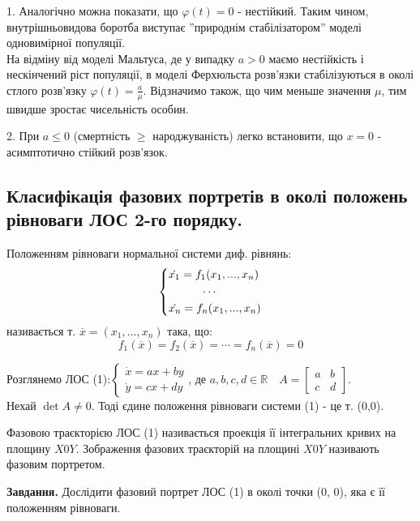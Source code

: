 \begin{remark}
    1. Аналогічно можна показати, що $\varphi (t) = 0$ - нестійкий. Таким чином, внутрішньовидова боротба виступає ''природнім стабілізатором'' моделі одновимірної популяції. \\
    На відміну від моделі Мальтуса, де у випадку $ a > 0$ маємо нестійкість і нескінчений ріст популяції, в моделі Ферхюльста розв'язки стабілізуються в околі стлого розв'язку $\varphi(t) = \frac{a}{\mu}.$ Відзначимо також, що чим меньше значення $\mu$, тим швидше зростає чисельність особин.
\end{remark}

\begin{remark}
    2. При $ a\leq 0$ (смертність $\geq$  народжуваність) легко встановити, що $ x=0 $ - асимптотично стійкий розв'язок.
\end{remark}

\subsection{Класифікація фазових портретів в околі положень рівноваги ЛОС 2-го порядку.}

\begin{defo}
    Положенням рівноваги нормальної системи диф. рівнянь:
    $$
    \begin{dcases}
        \dot{x_1} = f_1(x_1, ..., x_n)\\
        \qquad \quad \cdots\\
        \dot{x_n} = f_n(x_1, ..., x_n)
    \end{dcases}
    $$
    називається т. $\overline{x} = (x_1, ... , x_n)$ така, що:
    $$
    f_1 (\overline{x}) = f_2(\overline{x}) = \cdots = f_n(\overline{x}) =0
    $$
\end{defo}
Розглянемо ЛОС (1):$ \begin{cases}
    \dot{x} = ax + by\\
    \dot{y} = cx + dy
\end{cases}$, де $a,b,c,d \in \mathbb{R} \quad A = \begin{bmatrix}
 a & b\\
 c & d
\end{bmatrix}$.\\
Нехай $\det A \neq 0$. Тоді єдине положення рівноваги системи (1) - це т. (0,0).
\begin{defo}
    Фазовою траєкторією ЛОС (1) називається проекція її інтегральних кривих на площину $X0Y$. Зображення фазових траєкторій на площині $X0Y$ називають фазовим портретом.
\end{defo}
\textbf{Завдання.} Дослідити фазовий портрет ЛОС (1) в околі точки (0, 0), яка є її положенням рівноваги.\\

